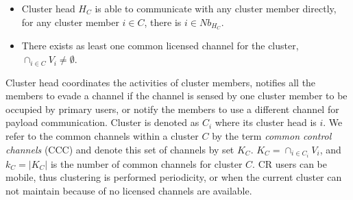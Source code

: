 \begin{itemize}
\item Cluster head $H_C$ is able to communicate with any cluster member directly, \ie for any cluster member $i\in C$, there is $i\in Nb_{H_C}$.
\item There exists as least one common licensed channel for the cluster, \ie $\cap_{i\in C} V_i \neq \emptyset$.
\end{itemize}
Cluster head coordinates the activities of cluster members, \ie notifies all the members to evade a channel if the channel is sensed by one cluster member to be occupied by primary users, or notify the members to use a different channel for payload communication. 
Cluster is denoted as $C_i$ where its cluster head is $i$.
We refer to the common channels within a cluster $C$ by the term \textit{common control channels} (\gls{CCC}) and denote this set of channels by set $K_C$.
$ K_C = \cap_{i\in C_i} V_i$, and $k_C = |K_C|$ is the number of common channels for cluster $C$.
CR users can be mobile, thus clustering is performed periodicity, or when the current cluster can not maintain because of no licensed channels are available.









